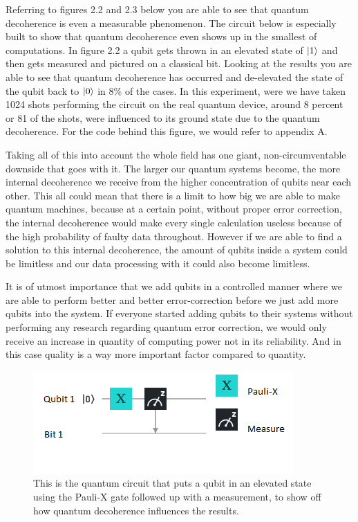 Referring to figures 2.2 and 2.3 below you are able to see that quantum decoherence is even a measurable phenomenon. The circuit below is especially built to show that quantum decoherence even shows up in the smallest of computations. In figure 2.2 a qubit gets thrown in an elevated state of $\ket{1}$ and then gets measured and pictured on a classical bit. Looking at the results you are able to see that quantum decoherence has occurred and de-elevated the state of the qubit back to $\ket{0}$ in 8\% of the cases. In this experiment, were we have taken 1024 shots performing the circuit on the real quantum device, around 8 percent or 81 of the shots, were influenced to its ground state due to the quantum decoherence. For the code behind this figure, we would refer to appendix A. 

Taking all of this into account the whole field has one giant, non-circumventable downside that goes with it. The larger our quantum systems become, the more internal decoherence we receive from the higher concentration of qubits near each other. This all could mean that there is a limit to how big we are able to make quantum machines, because at a certain point, without proper error correction, the internal decoherence would make every single calculation useless because of the high probability of faulty data throughout. However if we are able to find a solution to this internal decoherence, the amount of qubits inside a system could be limitless and our data processing with it could also become limitless. \autocite{Hartnett2019}

It is of utmost importance that we add qubits in a controlled manner where we are able to perform better and better error-correction before we just add more qubits into the system. If everyone started adding qubits to their systems without performing any research regarding quantum error correction, we would only receive an increase in quantity of computing power not in its reliability. And in this case quality is a way more important factor compared to quantity.

\begin{figure}[h]
	\centering
	\includegraphics[scale = 0.75]{../Demonstration/img/Quantum_decoherence_circuit.PNG}
	\caption{This is the quantum circuit that puts a qubit in an elevated state using the Pauli-X gate followed up with a measurement, to show off how quantum decoherence influences the results.}
\end{figure}

